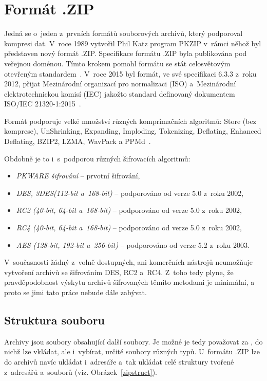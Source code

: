 \section{Formát .ZIP}
Jedná se o~jeden z~prvních formátů souborových archivů, který podporoval kompresi dat. V~roce 1989
vytvořil Phil Katz program PKZIP v~rámci něhož byl představen nový formát .ZIP. Specifikace
formátu .ZIP byla publikována pod veřejnou doménou. Tímto krokem pomohl formátu se stát
celosvětovým otevřeným standardem~\cite{PKWARE:2015}. V~roce 2015 byl formát, ve své specifikaci
6.3.3 z~roku 2012, přijat Mezinárodní organizací pro normalizaci (ISO) a~Mezinárodní
elektrotechnickou komisí (IEC) jakožto standard definovaný dokumentem ISO/IEC
21320-1:2015~\cite{ISOIEC:2015}.

 Formát podporuje velké množství různých komprimačních algoritmů: Store (bez komprese),
UnShrinking, Expanding, Imploding, Tokenizing, Deflating, Enhanced Deflating, BZIP2, LZMA, WavPack
a PPMd~\cite{PKWARE:2014}. 

 Obdobně je to i~s~podporou různých šifrovacích algoritmů:
\begin{itemize}
    \item {\it PKWARE šifrování} -- prvotní šifrování,
    \item {\it DES, 3DES(112-bit a~168-bit)} -- podporováno od verze 5.0 z~roku 2002,
    \item {\it RC2 (40-bit, 64-bit a~168-bit)} -- podporováno od verze 5.0 z~roku 2002,
    \item {\it RC4 (40-bit, 64-bit a~168-bit)} -- podporováno od verze 5.0 z~roku 2002,
    \item {\it AES (128-bit, 192-bit a~256-bit)} -- podporováno od verze 5.2 z~roku 2003.
\end{itemize}
V~současnosti žádný z~volně dostupných, ani komerčních nástrojů neumožňuje vytvoření archivů se
šifrováním DES, RC2 a~RC4. Z~toho tedy plyne, že pravděpodobnost výskytu archivů šifrovaných těmito
metodami je minimální, a proto se jimi tato práce nebude dále zabývat.

\subsection{Struktura souboru}
\label{ssec:zip_struct}
Archivy jsou soubory obsahující další soubory. Je možné je tedy považovat za , do nichž
lze vkládat, ale i~vybírat, určité soubory různých typů. U~formátu .ZIP lze do archivů navíc ukládat
i~adresáře a~tak ukládat celé struktury tvořené z~adresářů a~souborů (viz. Obrázek~\ref{zipstruct}).

